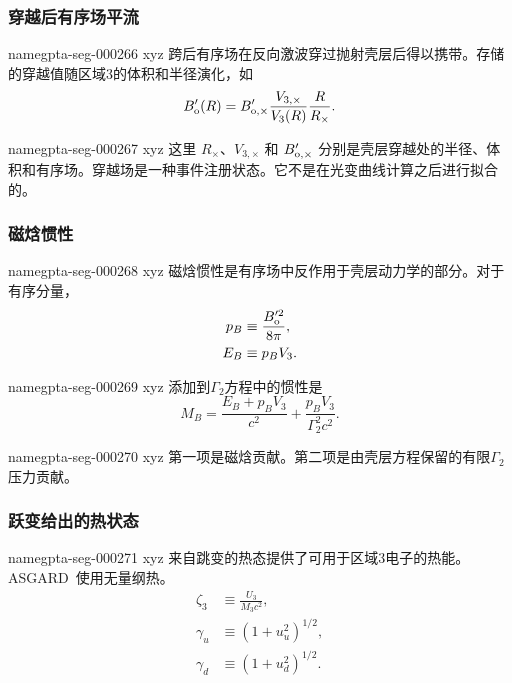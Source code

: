 \documentclass[twocolumn]{aastex702}
\makeatletter
\newcommand{\asgard}{\textsc{ASGARD}}
\providecommand{\gptareaderanchor}[1]{\pdfdest name{#1} xyz}%
\providecommand{\gptareaderanchor}[1]{\special{pdf:dest (#1) [ @thispage /XYZ @xpos @ypos null ]}}%
\makeatother
\begin{document}
\subsubsection{穿越后有序场平流}


\gptareaderanchor{gpta-seg-000266}%
跨后有序场在反向激波穿过抛射壳层后得以携带。存储的穿越值随区域3的体积和半径演化，如
\begin{equation}
B'_{\rm o}(R)=B'_{{\rm o},\times}
\frac{V_{3,\times}}{V_3(R)}
\frac{R}{R_\times}.
\end{equation}

\gptareaderanchor{gpta-seg-000267}%
这里 \(R_\times\)、\(V_{3,\times}\) 和 \(B'_{{\rm o},\times}\) 分别是壳层穿越处的半径、体积和有序场。穿越场是一种事件注册状态。它不是在光变曲线计算之后进行拟合的。

\subsubsection{磁焓惯性}


\gptareaderanchor{gpta-seg-000268}%
磁焓惯性是有序场中反作用于壳层动力学的部分。对于有序分量，
\begin{equation}
\begin{aligned}
p_B&\equiv \frac{B_{\rm o}^{\prime 2}}{8\pi},\\
E_B&\equiv p_BV_3 .
\end{aligned}
\end{equation}

\gptareaderanchor{gpta-seg-000269}%
添加到\(\Gamma_2\)方程中的惯性是
\begin{equation}
M_B=\frac{E_B+p_BV_3}{c^2}+\frac{p_BV_3}{\Gamma_2^2c^2}.
\end{equation}

\gptareaderanchor{gpta-seg-000270}%
第一项是磁焓贡献。第二项是由壳层方程保留的有限\(\Gamma_2\)压力贡献。

\subsubsection{跃变给出的热状态}


\gptareaderanchor{gpta-seg-000271}%
来自跳变的热态提供了可用于区域3电子的热能。\asgard\ 使用无量纲热。
\begin{equation}
\begin{aligned}
\zeta_3&\equiv\frac{U_3}{M_3c^2},\\
\gamma_u&\equiv(1+u_u^2)^{1/2},\\
\gamma_d&\equiv(1+u_d^2)^{1/2}.
\end{aligned}
\end{equation}
\end{document}

